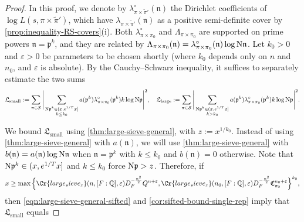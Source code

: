 \documentclass[11pt]{amsart}
\theoremstyle{remark}
\numberwithin{equation}{section}
\newcommand{\p}{\mathfrak{p}}
\newcommand{\kp}{\mathfrak{p}}
\newcommand{\n}{\mathfrak{n}}
\newcommand{\kn}{\mathfrak{n}}
\newcommand{\N}{\textnormal{N}}
\newcommand{\Q}{\mathbb{Q}}
\newcommand{\mS}{\mathcal{S}}
\newcommand{\eps}{\varepsilon}
\renewcommand{\tilde}{\widetilde}
\renewcommand{\epsilon}{\varepsilon}
\begin{document}
\begin{proof} 
In this proof, we denote by $\lambda^\circ_{\pi \times \tilde\pi'}(\n)$ the Dirichlet coefficients of $\log L(s, \pi \times \tilde\pi')$, which have $\lambda_{\pi \times \tilde\pi'}(\n)$ as a positive semi-definite cover by \cref{prop:inequality-RS-covers}(i). Both $\lambda^\circ_{\pi \times \pi_0}$ and $\Lambda_{\pi \times \pi_0}$ are supported on prime powers $\n = \p^k$, and they are related by $\Lambda_{\pi \times \pi_0}(\n) = \lambda^\circ_{\pi \times \pi_0}(\n) \log \N \n$.  Let $k_0 > 0$ and $\eps > 0$ be parameters to be chosen shortly (where $k_0$ depends only on $n$ and $n_0$, and $\eps$ is absolute).  By the Cauchy--Schwarz inequality, it suffices to separately estimate the two sums
{\small\[
    \mathfrak{L}_{\text{small}} := \sum_{\pi \in \mS}
    \Bigg| \sum_{\substack{\N \p^k \in (x, e^{1/T} x] \\ k \le k_0}} a(\p^k) \lambda^\circ_{\pi \times \pi_0}(\p^k) k \log \N \p \Bigg|^2,
    \ \ \ 
    \mathfrak{L}_{\text{large}} := \sum_{\pi \in \mS}
    \Bigg| \sum_{\substack{\N \p^k \in (x, e^{1/T} x] \\ k > k_0}} a(\p^k) \lambda^\circ_{\pi \times \pi_0}(\p^k) k \log \N \p \Bigg|^2.
\]}%

We bound $\mathfrak{L}_{\text{small}}$ using \cref{thm:large-sieve-general}, with $z := x^{1/k_0}$.  Instead of using \cref{thm:large-sieve-general} with $a(\kn)$, we will use \cref{thm:large-sieve-general} with $b(\kn)=
    a(\kn)\log\N\kn$ when $\kn=\kp^k$ with $k\leq k_0$ and $b(\kn)=0$ otherwise.  Note that $\N \p^k \in (x, e^{1/T} x]$ and $k \le k_0$ force $\N \p > z$. Therefore, if
\begin{equation}
\label{eqn:required-lower-bound-1}
    x \geq \max\Big\{\Cr{large_sieve_z}(n,[F:\Q],\epsilon)D_F^{-\frac{n^2}{2}}Q^{n+\eps},\Cr{large_sieve_z}(n_0,[F:\Q],\epsilon)D_F^{-\frac{n^2}{2}}\mathfrak{C}_{\pi_0}^{n_0+\eps}\Big\}^{k_0},
\end{equation}
then \eqref{eqn:large-sieve-general-sifted} and \cref{cor:sifted-bound-single-rep} imply that $\mathfrak{L}_{\text{small}}$ equals


\end{proof}
\end{document}
